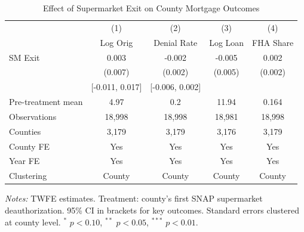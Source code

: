 \begin{table}[htbp]
\centering
\caption{Effect of Supermarket Exit on County Mortgage Outcomes}
\label{tab:main}
\begin{tabular}{lcccc}
\toprule
 & (1) & (2) & (3) & (4) \\
 & Log Orig & Denial Rate & Log Loan & FHA Share \\
\midrule
SM Exit & 0.003 & -0.002 & -0.005 & 0.002 \\
 & (0.007) & (0.002) & (0.005) & (0.002) \\
 & [-0.011, 0.017] & [-0.006, 0.002] & & \\
\addlinespace
Pre-treatment mean & 4.97 & 0.2 & 11.94 & 0.164 \\
Observations & 18,998 & 18,998 & 18,981 & 18,998 \\
Counties & 3,179 & 3,179 & 3,176 & 3,179 \\
County FE & Yes & Yes & Yes & Yes \\
Year FE & Yes & Yes & Yes & Yes \\
Clustering & County & County & County & County \\
\bottomrule
\end{tabular}
\begin{tablenotes}
\item \textit{Notes:} TWFE estimates. Treatment: county's first SNAP supermarket deauthorization.
95\% CI in brackets for key outcomes. Standard errors clustered at county level.
$^{*}$ $p < 0.10$, $^{**}$ $p < 0.05$, $^{***}$ $p < 0.01$.
\end{tablenotes}
\end{table}
